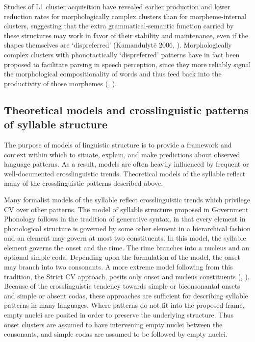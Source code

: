   Studies of L1 cluster acquisition have revealed earlier production and lower reduction rates for morphologically complex clusters than for morpheme-internal clusters, suggesting that the extra grammatical-semantic function carried by these structures may work in favor of their stability and maintenance, even if the shapes themselves are ‘dispreferred’ (Kamandulyt\.e 2006, \citealt{Zydorowicz2010}). Morphologically complex clusters with phonotactically ‘dispreferred’ patterns have in fact been proposed to facilitate parsing in speech perception, since they more reliably signal the morphological compositionality of words and thus feed back into the productivity of those morphemes (\citealt{HayBaayen2003}, \citealt{DresslerEtAl2010}). 

\subsection{Theoretical models and crosslinguistic patterns of syllable structure}\label{sec:1.1.3}

  The purpose of models of linguistic structure is to provide a framework and context within which to situate, explain, and make predictions about observed language patterns. As a result, models are often heavily influenced by frequent or well-documented crosslinguistic trends. Theoretical models of the syllable reflect many of the crosslinguistic patterns described above. 

  Many formalist models of the syllable reflect crosslinguistic trends which privilege CV over other patterns. The model of syllable structure proposed in Government Phonology \citep{KayeEtAl1990} follows in the tradition of generative syntax, in that every element in phonological structure is governed by some other element in a hierarchical fashion and an element may govern at most two constituents. In this model, the syllable element governs the onset and the rime. The rime branches into a nucleus and an optional simple coda. Depending upon the formulation of the model, the onset may branch into two consonants. A more extreme model following from this tradition, the Strict CV approach, posits only onset and nucleus constituents (\citealt{Lowenstamm1996}, \citealt{Scheer2004}). Because of the crosslinguistic tendency towards simple or biconsonantal onsets and simple or absent codas, these approaches are sufficient for describing syllable patterns in many languages. Where patterns do not fit into the proposed frame, empty nuclei are posited in order to preserve the underlying structure. Thus onset clusters are assumed to have intervening empty nuclei between the consonants, and simple codas are assumed to be followed by empty nuclei.

